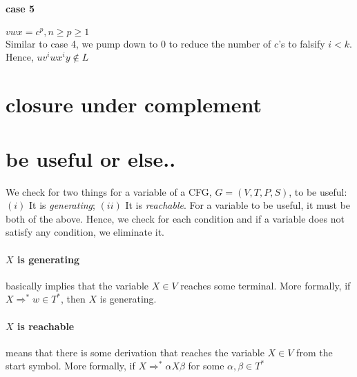 \documentclass[11pt,letterpaper]{article}
\begin{document}
\paragraph{case 5} $vwx = c^p, n \geq p \geq 1$ \\
Similar to case 4, we pump down to $0$ to reduce the number of $c$'s to falsify $i<k$. Hence, $uv^iwx^iy \notin L$

\section{closure under complement}

\section{be useful or else..}
We check for two things for a variable of a CFG, $G = (V,T,P,S)$, to be useful: $(i)$ It is \textit{generating}; $(ii)$ It is \textit{reachable}. For a variable to be useful, it must be both of the above. Hence, we check for each condition and if a variable does not satisfy any condition, we eliminate it.
\paragraph{$X$ is generating} basically implies that the variable $X \in V$ reaches some terminal. More formally, if $X \Rightarrow^* w \in T^*$, then $X$ is generating.
\paragraph{$X$ is reachable} means that there is some derivation that reaches the variable $X \in V$ from the start symbol. More formally, if $X \Rightarrow^* \alpha X \beta$ for some $\alpha, \beta \in T^*$
\end{document}
